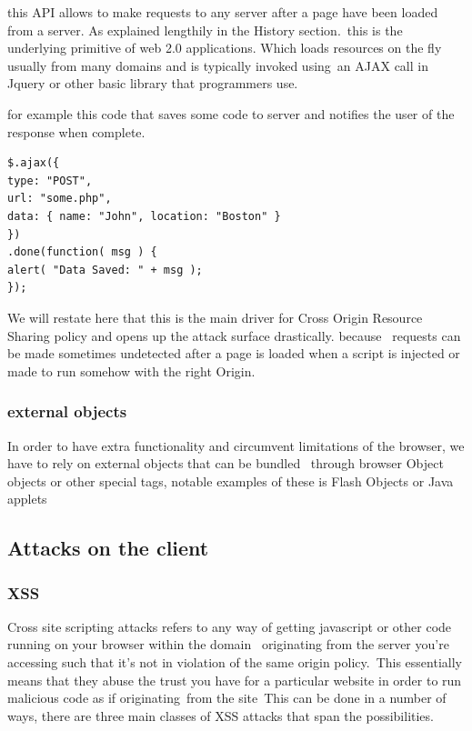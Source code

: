 \documentclass[a4paper,12pt]{paper}
\begin{document}
this API allows to make requests to any server after a page have been loaded from a server. As explained lengthily in the History section.\
this is the underlying primitive of web 2.0 applications. Which loads resources on the fly usually from many domains and is typically invoked using\
an AJAX call in Jquery or other basic library that programmers use.

for example this code that saves some code to server  and notifies the user of the response when complete.
\begin{verbatim}
$.ajax({
type: "POST",
url: "some.php",
data: { name: "John", location: "Boston" }
})
.done(function( msg ) {
alert( "Data Saved: " + msg );
});\end{verbatim}

We will restate here that this is the main driver for Cross Origin Resource Sharing policy and opens up the attack surface drastically. because \
requests can be made sometimes undetected after a page is loaded when a script is injected or made to run somehow with the right Origin.\

\subsubsection{external objects}

In order to have extra functionality and circumvent limitations of the browser, we have to rely on external objects that can be bundled \
through browser Object objects or other special tags, notable examples of these is Flash Objects or Java applets

\subsection{Attacks on the client}

\subsubsection{XSS}


Cross site scripting attacks refers to any way of getting javascript or other code running on your browser within the domain \
originating from the server you're accessing such that it's not in violation of the same origin policy.\
This essentially means that they abuse the trust you have for a particular website in order to run malicious code as if originating\
from the site\
This can be done in a number of ways, there are three main classes of XSS attacks that span the possibilities.\\
\end{document}
